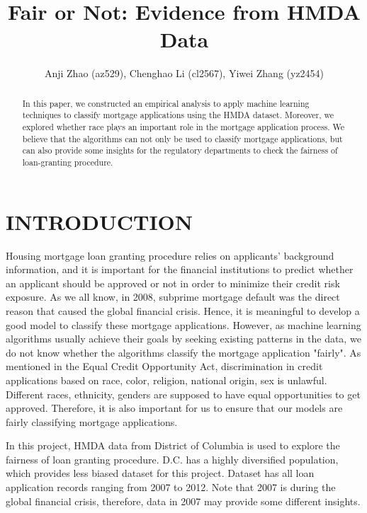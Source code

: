 \documentclass[letterpaper, 10 pt, conference]{ieeeconf}  %
\title{\LARGE \bf
Fair or Not: Evidence from HMDA Data
}
\author{Anji Zhao (az529), Chenghao Li (cl2567), Yiwei Zhang (yz2454)}%
\begin{document}
\maketitle
\thispagestyle{empty}
\pagestyle{empty}


\begin{abstract}
In this paper, we constructed an empirical analysis to apply machine learning techniques to classify mortgage applications using the HMDA dataset. Moreover, we explored whether race plays an important role in the mortgage application process. We believe that the algorithms can not only be used to classify mortgage applications, but can also provide some insights for the regulatory departments to check the fairness of loan-granting procedure. 
\end{abstract}


\section{INTRODUCTION}
Housing mortgage loan granting procedure relies on applicants' background information, and it is important for the financial institutions to predict whether an applicant should be approved or not in order to minimize their credit risk exposure. As we all know, in 2008, subprime mortgage default was the direct reason that caused the global financial crisis. Hence, it is meaningful to develop a good model to classify these mortgage applications. However, as machine learning algorithms usually achieve their goals by seeking existing patterns in the data, we do not know whether the algorithms classify the mortgage application "fairly". As mentioned in the Equal Credit Opportunity Act, discrimination in credit applications based on race, color, religion, national origin, sex is unlawful. Different races, ethnicity, genders are supposed to have equal opportunities to get approved. Therefore, it is also important for us to ensure that our models are fairly classifying mortgage applications.

In this project, HMDA data from District of Columbia is used to explore the fairness of loan granting procedure. D.C. has a highly diversified population, which provides less biased dataset for this project. Dataset has all loan application records ranging from 2007 to 2012. Note that 2007 is during the global financial crisis, therefore, data in 2007 may provide some different insights.
\end{document}
